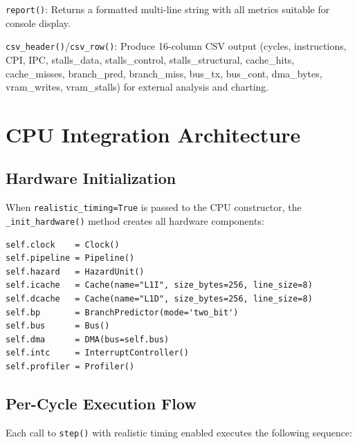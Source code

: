 \documentclass[10pt,a4paper,twoside]{book}
\begin{document}
\noindent\texttt{report()}: Returns a formatted multi-line string with all
metrics suitable for console display.

\noindent\texttt{csv\_header()}/\texttt{csv\_row()}: Produce 16-column CSV
output (cycles, instructions, CPI, IPC, stalls\_data, stalls\_control,
stalls\_structural, cache\_hits, cache\_misses, branch\_pred,
branch\_miss, bus\_tx, bus\_cont, dma\_bytes, vram\_writes,
vram\_stalls) for external analysis and charting.

\section{CPU Integration Architecture}

\subsection{Hardware Initialization}

When \texttt{realistic\_timing=True} is passed to the CPU constructor, the
\texttt{\_init\_hardware()} method creates all hardware components:

\begin{verbatim}
self.clock    = Clock()
self.pipeline = Pipeline()
self.hazard   = HazardUnit()
self.icache   = Cache(name="L1I", size_bytes=256, line_size=8)
self.dcache   = Cache(name="L1D", size_bytes=256, line_size=8)
self.bp       = BranchPredictor(mode='two_bit')
self.bus      = Bus()
self.dma      = DMA(bus=self.bus)
self.intc     = InterruptController()
self.profiler = Profiler()
\end{verbatim}

\subsection{Per-Cycle Execution Flow}

Each call to \texttt{step()} with realistic timing enabled executes the
following sequence:
\end{document}
